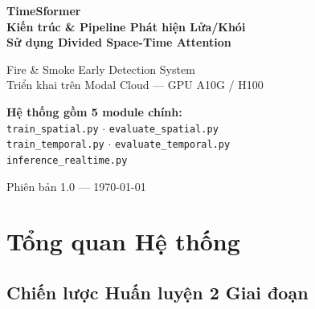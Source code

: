 \documentclass[12pt,a4paper]{article}
\begin{document}
\begin{titlepage}
  \centering
  \vspace*{2cm}

  {\Huge\bfseries\color{firebrick}
    TimeSformer\\[0.4em]
    \large\color{darkgray}
    Kiến trúc \& Pipeline Phát hiện Lửa/Khói\\[0.2em]
    Sử dụng Divided Space-Time Attention
  }

  \vspace{1.5cm}

  \vspace{1.5cm}
  {\large Fire \& Smoke Early Detection System}\\[0.5em]
  {\normalsize Triển khai trên Modal Cloud --- GPU A10G / H100}

  \vspace{2cm}
  \begin{tcolorbox}[
    colback=firebrick!8, colframe=firebrick!60,
    arc=6pt, boxrule=1pt,
    width=10cm, halign=center
  ]
    \textbf{Hệ thống gồm 5 module chính:}\\[6pt]
    \texttt{train\_spatial.py} $\cdot$ \texttt{evaluate\_spatial.py}\\
    \texttt{train\_temporal.py} $\cdot$ \texttt{evaluate\_temporal.py}\\
    \texttt{inference\_realtime.py}
  \end{tcolorbox}

  \vfill
  {\small\color{gray} Phiên bản 1.0 --- \today}
\end{titlepage}

\tableofcontents
\newpage

\section{Tổng quan Hệ thống}

\subsection{Chiến lược Huấn luyện 2 Giai đoạn}
\end{document}
